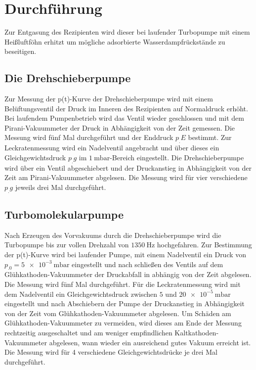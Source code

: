\section{Durchführung}
\label{sec:Durchführung}

Zur Entgasung des Rezipienten wird dieser bei laufender Turbopumpe mit einem Heißluftföhn erhitzt um mögliche adsorbierte Wasserdampfrückstände zu beseitigen.

\subsection{Die Drehschieberpumpe}

Zur Messung der p(t)-Kurve der Drehschieberpumpe wird mit einem Belüftungsventil der Druck im Inneren des Rezipienten auf Normaldruck erhöht. Bei laufendem Pumpenbetrieb wird das Ventil wieder geschlossen und mit dem Pirani-Vakuummeter der Druck in Abhängigkeit von der Zeit gemessen.
Die Messung wird fünf Mal durchgeführt und der Enddruck $p_.E$ bestimmt.\newline
Zur Leckratenmessung wird ein Nadelventil angebracht und über dieses ein Gleichgewichtsdruck $p_.g$ im $\SI{1}{\milli\bar}$-Bereich eingestellt. Die Drehschieberpumpe wird über ein Ventil abgeschiebert und der Druckanstieg in Abhängigkeit von der Zeit am Pirani-Vakuummeter abgelesen.
Die Messung wird für vier verschiedene $p_.g$ jeweils drei Mal durchgeführt.

\subsection{Turbomolekularpumpe}

Nach Erzeugen des Vorvakuums durch die Drehschieberpumpe wird die Turbopumpe bis zur vollen Drehzahl von $\SI{1350}{\hertz}$ hochgefahren.
Zur Bestimmung der p(t)-Kurve wird bei laufender Pumpe, mit einem Nadelventil ein Druck von $p_.0=\SI{5e-3}{\milli\bar}$ eingestellt und nach schließen des Ventils auf dem Glühkathoden-Vakuummeter der Druckabfall in abhängig von der Zeit abgelesen. Die Messung wird fünf Mal durchgeführt.\newline
Für die Leckratenmessung wird mit dem Nadelventil ein Gleichgewichtsdruck zwischen $5$ und $\SI{20e-5}{\milli\bar}$ eingestellt und nach Abschiebern der Pumpe der Druckanstieg in Abhängigkeit von der Zeit vom Glühkathoden-Vakuummeter abgelesen. Um Schäden am Glühkathoden-Vakuummeter zu vermeiden, wird dieses am Ende der Messung rechtzeitig ausgeschaltet und am weniger empfindlichen Kaltkathoden-Vakuummeter abgelesen, wann wieder ein ausreichend gutes Vakuum erreicht ist. Die Messung wird für 4 verschiedene Gleichgewichtsdrücke je drei Mal durchgeführt.



